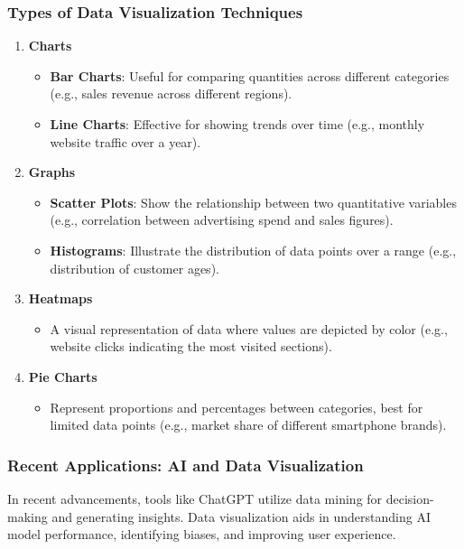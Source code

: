 \documentclass[aspectratio=169]{beamer}
\begin{document}
\begin{frame}[fragile]
    \frametitle{Types of Data Visualization Techniques}
    \begin{enumerate}
        \item \textbf{Charts}
            \begin{itemize}
                \item \textbf{Bar Charts}: Useful for comparing quantities across different categories (e.g., sales revenue across different regions).
                \item \textbf{Line Charts}: Effective for showing trends over time (e.g., monthly website traffic over a year).
            \end{itemize}
        
        \item \textbf{Graphs}
            \begin{itemize}
                \item \textbf{Scatter Plots}: Show the relationship between two quantitative variables (e.g., correlation between advertising spend and sales figures).
                \item \textbf{Histograms}: Illustrate the distribution of data points over a range (e.g., distribution of customer ages).
            \end{itemize}
        
        \item \textbf{Heatmaps}
            \begin{itemize}
                \item A visual representation of data where values are depicted by color (e.g., website clicks indicating the most visited sections).
            \end{itemize}
        
        \item \textbf{Pie Charts}
            \begin{itemize}
                \item Represent proportions and percentages between categories, best for limited data points (e.g., market share of different smartphone brands).
            \end{itemize}
    \end{enumerate}
\end{frame}

\begin{frame}[fragile]
    \frametitle{Recent Applications: AI and Data Visualization}
    In recent advancements, tools like ChatGPT utilize data mining for decision-making and generating insights. Data visualization aids in understanding AI model performance, identifying biases, and improving user experience.
\end{frame}
\end{document}
